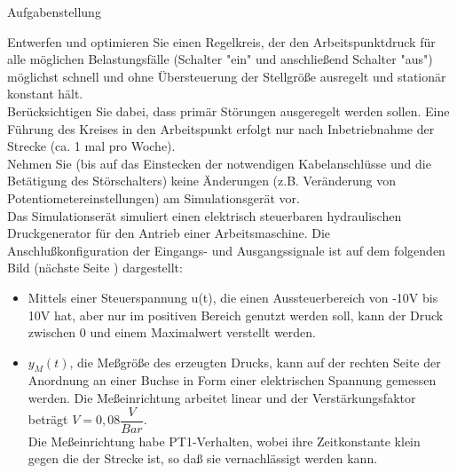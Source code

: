 \documentclass[11pt, a4paper,parskip=half]{article}
\begin{document}
\pagestyle{fancy}






\newpage
\begin{huge}
Aufgabenstellung\\

\end{huge}
Entwerfen und optimieren Sie einen Regelkreis, der den Arbeitspunktdruck für alle möglichen Belastungsfälle (Schalter "ein" und anschließend Schalter "aus") möglichst schnell und ohne Übersteuerung der Stellgröße ausregelt und stationär konstant hält.\\

Berücksichtigen Sie dabei, dass primär Störungen ausgeregelt werden sollen. Eine Führung des Kreises in den Arbeitspunkt erfolgt nur nach Inbetriebnahme der Strecke (ca. 1 mal pro Woche).\\

Nehmen Sie (bis auf das Einstecken der notwendigen Kabelanschlüsse und die Betätigung des Störschalters) keine Änderungen (z.B. Veränderung von Potentiometereinstellungen) am Simulationsgerät vor.\\

Das Simulationserät simuliert einen elektrisch steuerbaren hydraulischen Druckgenerator für den Antrieb einer Arbeitsmaschine. Die Anschlußkonfiguration der Eingangs- und Ausgangssignale ist auf dem folgenden Bild (nächste Seite ) dargestellt:\\

\begin{itemize}
\item Mittels einer Steuerspannung u(t), die einen Aussteuerbereich von -10V bis 10V hat, aber nur im positiven Bereich genutzt werden soll, kann der Druck zwischen 0 und einem Maximalwert verstellt werden.

\item $y_{M} (t)$, die Meßgröße des erzeugten Drucks, kann auf der rechten Seite der Anordnung an einer Buchse in Form einer elektrischen Spannung gemessen werden. Die Meßeinrichtung arbeitet linear und der Verstärkungsfaktor beträgt $V =0,08 \dfrac{V}{Bar}$.\\
Die Meßeinrichtung habe PT1-Verhalten, wobei ihre Zeitkonstante klein gegen die der Strecke ist, so daß sie vernachlässigt werden kann.

\end{itemize}
\end{document}

